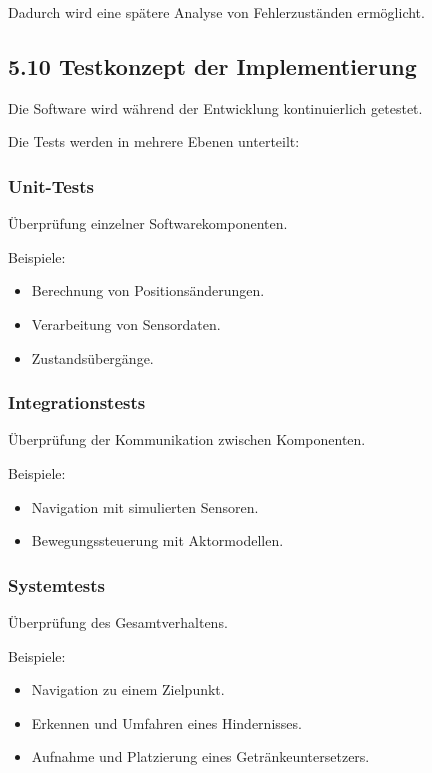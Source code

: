 \documentclass[
  a4paper,
  12pt,
  DIV=12,        %
  parskip=half,  %
  headings=small %
]{scrartcl}
\theoremstyle{definition}
\providecommand{\tightlist}{%
  \setlength{\itemsep}{0pt}\setlength{\parskip}{0pt}}
\theoremstyle{definition}
\providecommand{\tightlist}{%
  \setlength{\itemsep}{0pt}\setlength{\parskip}{0pt}}
\begin{document}
Dadurch wird eine spätere Analyse von Fehlerzuständen ermöglicht.

\subsection{5.10 Testkonzept der
Implementierung}\label{testkonzept-der-implementierung}

Die Software wird während der Entwicklung kontinuierlich getestet.

Die Tests werden in mehrere Ebenen unterteilt:

\subsubsection{Unit-Tests}\label{unit-tests}

Überprüfung einzelner Softwarekomponenten.

Beispiele:

\begin{itemize}
\tightlist
\item
  Berechnung von Positionsänderungen.
\item
  Verarbeitung von Sensordaten.
\item
  Zustandsübergänge.
\end{itemize}

\subsubsection{Integrationstests}\label{integrationstests}

Überprüfung der Kommunikation zwischen Komponenten.

Beispiele:

\begin{itemize}
\tightlist
\item
  Navigation mit simulierten Sensoren.
\item
  Bewegungssteuerung mit Aktormodellen.
\end{itemize}

\subsubsection{Systemtests}\label{systemtests}

Überprüfung des Gesamtverhaltens.

Beispiele:

\begin{itemize}
\tightlist
\item
  Navigation zu einem Zielpunkt.
\item
  Erkennen und Umfahren eines Hindernisses.
\item
  Aufnahme und Platzierung eines Getränkeuntersetzers.
\end{itemize}
\end{document}
